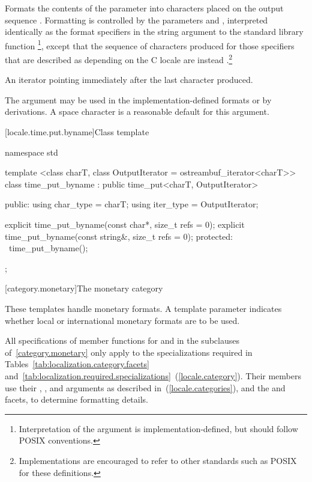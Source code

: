 \begin{itemdescr}
\pnum
\effects
Formats the contents of the parameter 
into characters placed on the output sequence .
Formatting is controlled by the parameters  and ,
interpreted identically as the format specifiers in the string
argument to the standard library function
%
\footnote{Interpretation of the 
argument is implementation-defined, but should follow POSIX
conventions.},
except that the sequence of characters produced for those specifiers
that are described as depending on the C locale are instead .\footnote{Implementations are encouraged to refer to other standards
such as POSIX
for these definitions.}

\pnum
\returns
An iterator pointing immediately after the last character produced.
\begin{note}
The  argument may be used in the implementation-defined
formats or by derivations. A space character is a reasonable
default for this argument.
\end{note}
\end{itemdescr}

[locale.time.put.byname]{Class template }

%
\begin{codeblock}
namespace std {
  template <class charT, class OutputIterator = ostreambuf_iterator<charT>>
  class time_put_byname : public time_put<charT, OutputIterator>
  {
  public:
    using char_type = charT;
    using iter_type = OutputIterator;

    explicit time_put_byname(const char*, size_t refs = 0);
    explicit time_put_byname(const string&, size_t refs = 0);
  protected:
    ~time_put_byname();
  };
}
\end{codeblock}

[category.monetary]{The monetary category}

\pnum
These templates handle monetary formats.
A template parameter indicates whether
local or international monetary formats are to be used.

\pnum
All specifications of member functions for
and
in the subclauses of~\ref{category.monetary} only apply to the
specializations required in Tables~\ref{tab:localization.category.facets}
and~\ref{tab:localization.required.specializations}~(\ref{locale.category}).
Their members use their
,
,
and
arguments as described in~(\ref{locale.categories}), and the
and
facets, to determine formatting details.

